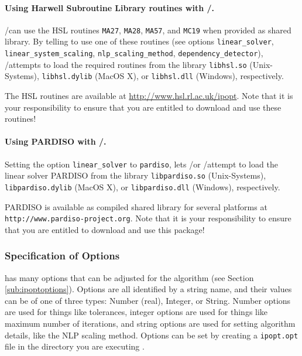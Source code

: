 \paragraph{Using Harwell Subroutine Library routines with \GAMS/\IPOPT.}

\GAMS/\IPOPT can use the HSL routines \texttt{MA27}, \texttt{MA28}, \texttt{MA57}, and \texttt{MC19} when provided as shared library.
By telling \IPOPT to use one of these routines (see options \texttt{linear\_solver}, \texttt{linear\_system\_scaling}, \texttt{nlp\_scaling\_method}, \texttt{dependency\_detector}), \GAMS/\IPOPT attempts to load the required routines from the library \texttt{libhsl.so} (Unix-Systems), \texttt{libhsl.dylib} (MacOS X), or \texttt{libhsl.dll} (Windows), respectively.

The HSL routines are available at \url{http://www.hsl.rl.ac.uk/ipopt}.
Note that it is your responsibility to ensure that you are entitled to download and use these routines!

\paragraph{Using PARDISO with \GAMS/\IPOPT.}
Setting the option \texttt{linear\_solver} to \texttt{pardiso}, lets \GAMS/\IPOPT or \GAMS/\IPOPTH attempt to load the linear solver PARDISO from the library \texttt{libpardiso.so} (Unix-Systems), \texttt{libpardiso.dylib} (MacOS X), or \texttt{libpardiso.dll} (Windows), respectively.

PARDISO is available as compiled shared library for several platforms at \texttt{http://www.pardiso-project.org}.
Note that it is your responsibility to ensure that you are entitled to download and use this package!

\subsubsection{Specification of Options}
\label{sub:ipoptoptionspec}

\IPOPT has many options that can be adjusted for the algorithm (see Section \ref{sub:ipoptoptions}).
Options are all identified by a string name, and their values can be of one of three types: Number (real), Integer, or String.
Number options are used for things like tolerances, integer options are used for things like maximum number of iterations, and string options are used for setting algorithm details, like the NLP scaling method.
Options can be set by creating a \texttt{ipopt.opt} file in the directory you are executing \IPOPT.

